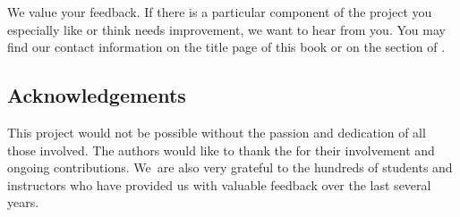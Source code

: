 We value your feedback. If there is a particular component of the project you especially like or think needs improvement, we want to hear from you. You may find our contact information on the title page of this book or on the  section of .

\subsection*{Acknowledgements}

This project would not be possible without the passion and dedication of all those involved. %
The authors would like to thank the  for their involvement and ongoing contributions. We~are also very grateful to the hundreds of students and instructors who have provided us with valuable feedback over the last several years.
